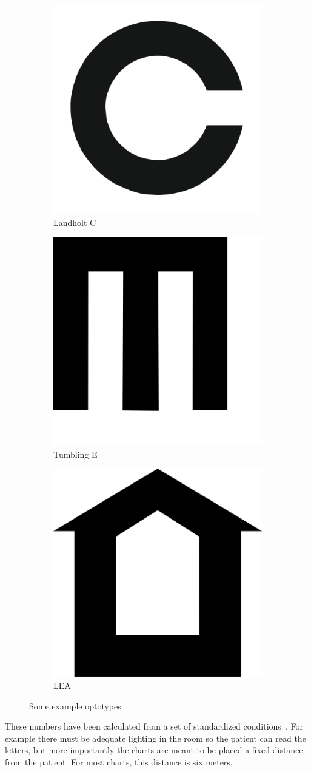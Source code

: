 \documentclass[12pt,a4paper,notitlepage]{report}
\begin{document}
\begin{figure}[ht!]
\centering
\begin{subfigure}{.3\textwidth}
  \centering
  \includegraphics[width=.4\linewidth]{images/landholt_c_optotype.png}
  \caption{Landholt C}
\end{subfigure}%
\begin{subfigure}{.3\textwidth}
  \centering
  \includegraphics[width=.4\linewidth]{images/tumbling_e_optotype.png}
  \caption{Tumbling E}
\end{subfigure}
\begin{subfigure}{.3\textwidth}
  \centering
  \includegraphics[width=.4\linewidth]{images/lea_optotype.png}
  \caption{LEA}
\end{subfigure}
\caption{Some example optotypes}
\label{fig:optotypes_example1}
\end{figure}

These numbers have been calculated from a set of standardized conditions~\cite{Bailey}. For example there must be adequate lighting in the room so the patient can read the letters, but more importantly the charts are meant to be placed a fixed distance from the patient. For most charts, this distance is six meters. 
\end{document}
